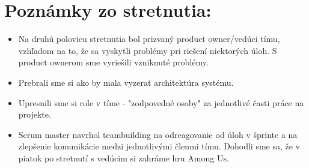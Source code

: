 \documentclass{article}
\begin{document}
    \section*{Poznámky zo stretnutia:}

    \begin{itemize}
        \item Na druhú polovicu stretnutia bol prizvaný product owner/vedúci tímu, vzhľadom na to, že sa vyskytli problémy pri riešení niektorých úloh. S product ownerom sme vyriešili vzniknuté problémy. 
        \item Prebrali sme si ako by mala vyzerať architektúra systému. 
        \item Upresnili sme si role v tíme - "zodpovedné osoby" za jednotlivé časti práce na projekte.
        \item Scrum master navrhol teambuilding na odreagovanie od úloh v šprinte a na zlepšenie komunikácie medzi jednotlivými členmi tímu. Dohodli sme sa, že v piatok po stretnutí s vedúcim si zahráme hru Among Us.
    \end{itemize}
\end{document}
